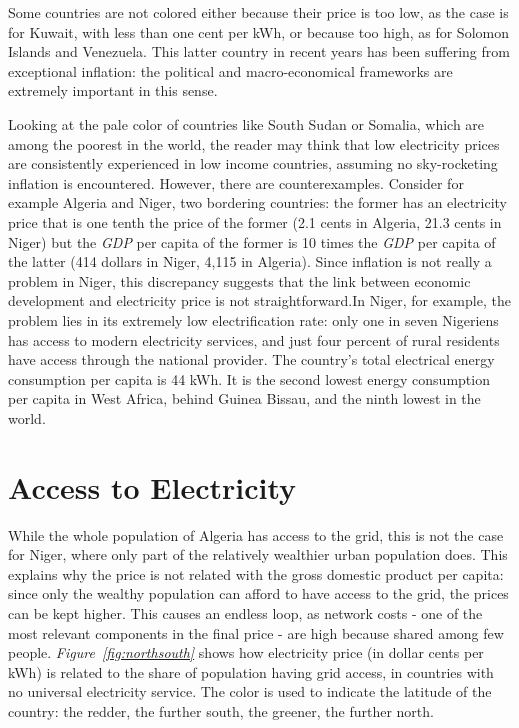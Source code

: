\documentclass[a4paper,12pt]{book}
\begin{document}
Some countries are not colored either because their price is too low, as the case is for Kuwait, with less than one cent per kWh, or because too high, as for Solomon Islands and Venezuela. This latter country in recent years has been suffering from exceptional inflation: the political and macro-economical frameworks are extremely important in this sense.

Looking at the pale color of countries like South Sudan or Somalia, which are among the poorest in the world, the reader may think that low electricity prices are consistently experienced in low income countries, assuming no sky-rocketing inflation is encountered. However, there are counterexamples. Consider for example Algeria and Niger, two bordering countries: the former has an electricity price that is one tenth the price of the former (2.1 cents in Algeria, 21.3 cents in Niger) but the \textit{GDP} per capita of the former is 10 times the \textit{GDP} per capita of the latter (414 dollars in Niger, 4,115 in Algeria). Since inflation is not really a problem in Niger, this discrepancy suggests that the link between economic development and electricity price is not straightforward.In Niger, for example, the problem lies in its extremely low electrification rate: only one in seven Nigeriens has access to modern electricity services, and just four percent of rural residents have access through the national provider. The country's total electrical energy consumption per capita is 44 kWh. It is the second lowest energy consumption per capita in West Africa, behind Guinea Bissau, and the ninth lowest in the world. 

\section{Access to Electricity}

While the whole population of Algeria has access to the grid, this is not the case for Niger, where only part of the relatively wealthier urban population does. This explains why the price is not related with the gross domestic product per capita: since only the wealthy population can afford to have access to the grid, the prices can be kept higher. This causes an endless loop, as network costs - one of the most relevant components in the final price - are high because  shared among few people. \textit{Figure~\ref{fig:northsouth}} shows how electricity price (in dollar cents per kWh) is related to the share of population having grid access, in countries with no universal electricity service. The color is used to indicate the latitude of the country: the redder, the further south, the greener, the further north.
\end{document}
